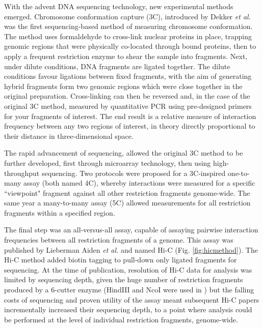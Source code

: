 \documentclass[a4paper,10pt,oneside]{book}
\begin{document}
With the advent DNA sequencing technology, new experimental methods emerged. Chromosome conformation capture (3C), introduced by Dekker \emph{et al.}\cite{Dekker2002} was the first sequencing-based method of measuring chromosome conformation. The method uses formaldehyde to cross-link nuclear proteins in place, trapping genomic regions that were physically co-located through bound proteins, then to apply a frequent restriction enzyme to shear the sample into fragments. Next, under dilute conditions, DNA fragments are ligated together. The dilute conditions favour ligations between fixed fragments, with the aim of generating hybrid fragments form two genomic regions which were close together in the original preparation. Cross-linking can then be reversed and, in the case of the original 3C method, measured by quantitative PCR using pre-designed primers for your fragments of interest. The end result is a relative measure of interaction frequency between any two regions of interest, in theory directly proportional to their distance in three-dimensional space.

The rapid advancement of sequencing, allowed the original 3C method to be further developed, first through microarray technology, then using high-throughput sequencing. Two protocols were proposed for a 3C-inspired one-to-many assay\cite{Zhao2006, Simonis2006} (both named 4C), whereby interactions were measured for a specific ``viewpoint" fragment against all other restriction fragments genome-wide. The same year a many-to-many assay (5C) allowed measurements for all restriction fragments within a specified region.\cite{Dostie2006} 

The final step was an all-versus-all assay, capable of assaying pairwise interaction frequencies between all restriction fragments of a genome. This assay was published by Lieberman Aiden \emph{et al.}\cite{Lieberman2009} and named Hi-C (Fig. \ref{fig:hicmethod}). The Hi-C method added biotin tagging to pull-down only ligated fragments for sequencing. At the time of publication, resolution of Hi-C data for analysis was limited by sequencing depth, given the huge number of restriction fragments produced by a 6-cutter enzyme (HindIII and NcoI were used in \cite{Lieberman2009}) but the falling costs of sequencing and proven utility of the assay meant subsequent Hi-C papers incrementally increased their sequencing depth, to a point where analysis could be performed at the level of individual restriction fragments, genome-wide.\cite{Dixon2012,  Selvaraj2013a, Jin2013, Rao2014}
\end{document}
